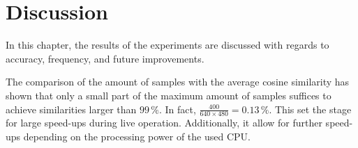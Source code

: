 \chapter{Discussion}
\label{chap:discussion}

In this chapter, the results of the experiments are discussed with regards to accuracy, frequency, and future improvements.

The comparison of the amount of samples with the average cosine
similarity has shown that only a small part of the maximum amount of
samples suffices to achieve similarities larger than $99\,\%$. In
fact, $\frac{400}{640 \times 480} = 0.13\,\%$. This set the stage for
large speed-ups during live operation. Additionally, it allow for further speed-ups depending on the processing power of the used
CPU.
